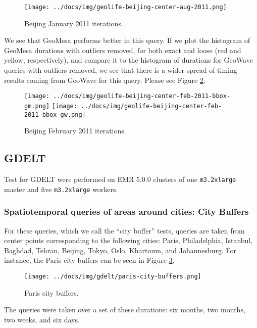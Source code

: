 \begin{figure}[h!tb]
  \centering
  \texttt{[image: ../docs/img/geolife-beijing-center-aug-2011.png]}
  \caption{Beijing January 2011 iterations.}
  \label{beijingjan2011}
\end{figure}

We see that GeoMesa performs better in this query.
If we plot the histogram of GeoMesa durations with outliers removed,
for both exact and loose (red and yellow, respectively), and compare it to the histogram of durations for GeoWave queries with outliers removed,
we see that there is a wider spread of timing results coming from GeoWave for this query.
Please see Figure \ref{beijingfeb2011}.

\begin{figure}[h!tb]
  \centering
  \texttt{[image: ../docs/img/geolife-beijing-center-feb-2011-bbox-gm.png]}
  \texttt{[image: ../docs/img/geolife-beijing-center-feb-2011-bbox-gw.png]}
  \caption{Beijing February 2011 iterations.}
  \label{beijingfeb2011}
\end{figure}


\subsection{GDELT}

Test for GDELT were performed on EMR 5.0.0 clusters of one \texttt{m3.2xlarge} master and five \texttt{m3.2xlarge} workers.

\subsubsection{Spatiotemporal queries of areas around cities: City Buffers}

For these queries, which we call the ``city buffer'' tests, queries are taken from center points corresponding to the following cities:
Paris, Philadelphia, Istanbul, Baghdad, Tehran, Beijing, Tokyo, Oslo, Khartoum, and Johannesburg.
For instance, the Paris city buffers can be seen in Figure \ref{paris}.

\begin{figure}[h!tb]
  \centering
  \texttt{[image: ../docs/img/gdelt/paris-city-buffers.png]}
  \caption{Paris city buffers.}
  \label{paris}
\end{figure}

The queries were taken over a set of these durations: six months, two months, two weeks, and six days.

